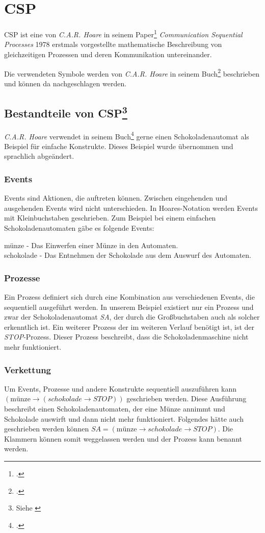 \section{\acl{CSP}}
\acf{CSP} ist eine von \textit{C.A.R. Hoare} in seinem Paper\footcite{CSP} \textit{Communication Sequential Processes} 1978 erstmals vorgestellte mathematische Beschreibung von gleichzeitigen Prozessen und deren Kommunikation untereinander.


Die verwendeten Symbole werden von \textit{C.A.R. Hoare} in seinem Buch\footcite[Glossary of Symbols]{CSPBOOK} beschrieben und können da nachgeschlagen werden.
\subsection[Bestandteile von \acs{CSP}]{Bestandteile von \acs{CSP}\footnote{Siehe \cite[Kapitel 1.1]{CSPBOOK}}}
\textit{C.A.R. Hoare} verwendet in seinem Buch\footcite{CSPBOOK} gerne einen Schokoladenautomat als Beispiel für einfache Konstrukte. Dieses Beispiel wurde übernommen und sprachlich abgeändert.
\subsubsection{Events}
Events sind Aktionen, die auftreten können. Zwischen eingehenden und ausgehenden Events wird nicht unterschieden. In Hoares-Notation werden Events mit Kleinbuchstaben geschrieben.
Zum Beispiel bei einem einfachen Schokoladenautomaten gäbe es folgende Events:

\begin{addmargin}[1cm]{0cm}
münze - Das Einwerfen einer Münze in den Automaten.\\
schokolade - Das Entnehmen der Schokolade aus dem Auswurf des Automaten.
\end{addmargin}

\subsubsection{Prozesse}
Ein Prozess definiert sich durch eine Kombination aus verschiedenen Events, die sequentiell ausgeführt werden. In unserem Beispiel existiert nur ein Prozess und zwar der Schokoladenautomat \textit{SA}, der durch die Großbuchstaben auch als solcher erkenntlich ist. Ein weiterer Prozess der im weiteren Verlauf benötigt ist, ist der \textit{STOP}-Prozess. Dieser Prozess beschreibt, dass die Schokoladenmaschine nicht mehr funktioniert.

\subsubsection{Verkettung}
Um Events, Prozesse und andere Konstrukte sequentiell auszuführen kann $ (\text{münze} \rightarrow (schokolade \rightarrow STOP)) $ geschrieben werden. Diese Ausführung beschreibt einen Schokoladenautomaten, der eine Münze annimmt und Schokolade auswirft und dann nicht mehr funktioniert. Folgendes hätte auch geschrieben werden können $ SA = (\text{münze} \rightarrow schokolade \rightarrow STOP) $. Die Klammern können somit weggelassen werden und der Prozess kann benannt werden.


